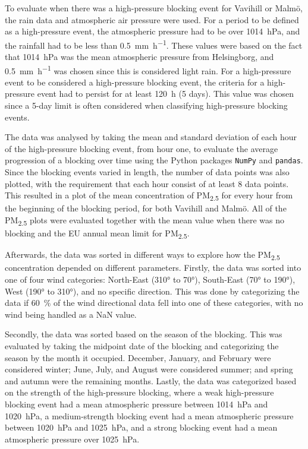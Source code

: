 To evaluate when there was a high-pressure blocking event for Vavihill or Malmö, the rain data and atmospheric air pressure were used. For a period to be defined as a high-pressure event, the atmospheric pressure had to be over \SI{1014}{\hecto\pascal}, and the rainfall had to be less than \SI{0.5}{\mm\per\hour}. These values were based on the fact that \SI{1014}{\hecto\pascal} was the mean atmospheric pressure from Helsingborg, and \SI{0.5}{\mm\per\hour} was chosen since this is considered light rain. For a high-pressure event to be considered a high-pressure blocking event, the criteria for a high-pressure event had to persist for at least \SI{120}{\hour} (5 days). This value was chosen since a 5-day limit is often considered when classifying high-pressure blocking events.

The data was analysed by taking the mean and standard deviation of each hour of the high-pressure blocking event, from hour one, to evaluate the average progression of a blocking over time using the Python packages \texttt{NumPy} and \texttt{pandas}. Since the blocking events varied in length, the number of data points was also plotted, with the requirement that each hour consist of at least 8 data points. This resulted in a plot of the mean concentration of PM\textsubscript{2.5} for every hour from the beginning of the blocking period, for both Vavihill and Malmö. All of the PM\textsubscript{2.5} plots were evaluated together with the mean value when there was no blocking and the EU annual mean limit for PM\textsubscript{2.5}.

Afterwards, the data was sorted in different ways to explore how the PM\textsubscript{2.5} concentration depended on different parameters. Firstly, the data was sorted into one of four wind categories: North-East (310° to 70°), South-East (70° to 190°), West (190° to 310°), and no specific direction. This was done by categorizing the data if \SI{60}{\%} of the wind directional data fell into one of these categories, with no wind being handled as a NaN value.

Secondly, the data was sorted based on the season of the blocking. This was evaluated by taking the midpoint date of the blocking and categorizing the season by the month it occupied. December, January, and February were considered winter; June, July, and August were considered summer; and spring and autumn were the remaining months. Lastly, the data was categorized based on the strength of the high-pressure blocking, where a weak high-pressure blocking event had a mean atmospheric pressure between \SI{1014}{\hecto\pascal} and \SI{1020}{\hecto\pascal}, a medium-strength blocking event had a mean atmospheric pressure between \SI{1020}{\hecto\pascal} and \SI{1025}{\hecto\pascal}, and a strong blocking event had a mean atmospheric pressure over \SI{1025}{\hecto\pascal}.

